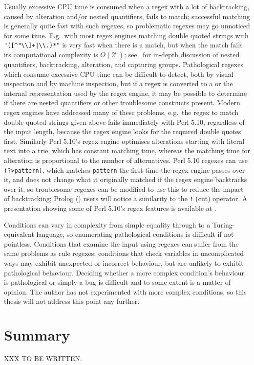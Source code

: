 Usually excessive CPU time is consumed when a regex with a lot of
backtracking, caused by alteration and/or nested quantifiers, fails to
match; successful matching is generally quite fast with such regexes, so
problematic regexes may go unnoticed for some time.  E.g.\ with most regex
engines matching double quoted strings with \verb!"([^"\\]+|\\.)*"! is very
fast when there is a match, but when the match fails its computational
complexity is $O(2^{n})$; see~\cite{mastering-regular-expressions} for
in-depth discussion of nested quantifiers, backtracking, alteration, and
capturing groups.  Pathological regexes which consume excessive CPU time
can be difficult to detect, both by visual inspection and by machine
inspection, but if a regex is converted to a  or the internal
representation used by the regex engine, it may be possible to determine if
there are nested quantifiers or other troublesome constructs present.
Modern regex engines have addressed many of these problems, e.g.\ the regex
to match double quoted strings given above fails immediately with Perl
5.10, regardless of the input length, because the regex engine looks for
the required double quotes first.  Similarly Perl 5.10's regex engine
optimises alterations starting with literal text into a trie, which has
constant matching time, whereas the matching time for alteration is
proportional to the number of alternatives.  Perl 5.10 regexes can use
\verb!(?>pattern)!, which matches \verb!pattern! the first time the regex
engine passes over it, and does not change what it originally matched if
the regex engine backtracks over it, so troublesome regexes can be modified
to use this to reduce the impact of backtracking; Prolog
()
users will notice a similarity to the \verb'!' (cut) operator.  A
presentation showing some of Perl 5.10's regex features is available at
.

Conditions can vary in complexity from simple equality through to a
Turing-equivalent language, so enumerating pathological conditions is
difficult if not pointless.  Conditions that examine the input using
regexes can suffer from the same problems as rule regexes; conditions that
check variables in uncomplicated ways may exhibit unexpected or incorrect
behaviour, but are unlikely to exhibit pathological behaviour.  Deciding
whether a more complex condition's behaviour is pathological or simply a
bug is difficult and to some extent is a matter of opinion.  The author has
not experimented with more complex conditions, so this thesis will not
address this point any further.

\section{Summary}

XXX TO BE WRITTEN\@.
